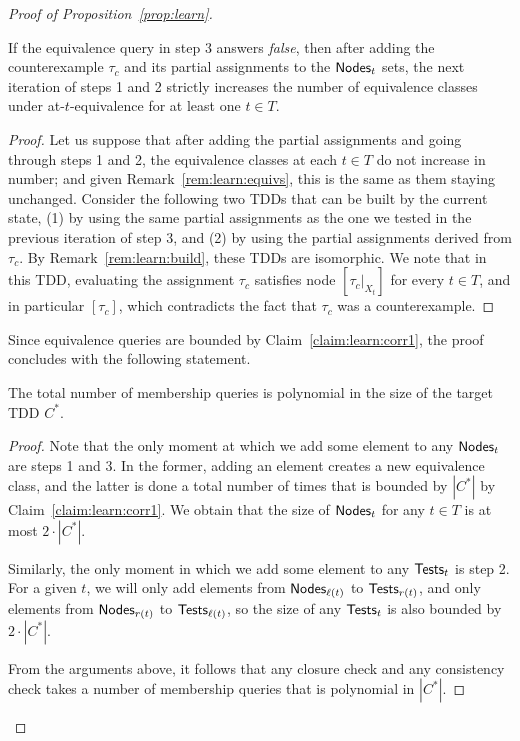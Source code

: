 \begin{toappendix}
\begin{proof}[Proof of Proposition~\ref{prop:learn}]
\begin{claim}\label{claim:learn:corr1}
If the equivalence query in step 3 answers {\em false}, then after adding the counterexample $\tau_c$ and its partial assignments to the ${\sf Nodes}_t$ sets, the next iteration of steps 1 and 2 strictly increases the number of equivalence classes under at-$t$-equivalence for at least one $t\in T$. 
\end{claim}
\begin{proof}
Let us suppose that after adding the partial assignments and going through steps 1 and 2, the equivalence classes at each $t\in T$ do not increase in number; and given Remark~\ref{rem:learn:equivs}, this is the same as them staying unchanged. Consider the following two TDDs that can be built by the current state, (1) by using the same partial assignments as the one we tested in the previous iteration of step 3, and (2) by using the partial assignments derived from $\tau_c$. By Remark~\ref{rem:learn:build}, these TDDs are isomorphic. We note that in this TDD, evaluating the assignment $\tau_c$ satisfies node $[\tau_c\vert_{X_t}]$ for every $t\in T$, and in particular $[\tau_c]$, which contradicts the fact that $\tau_c$ was a counterexample.
\end{proof}
Since equivalence queries are bounded by Claim~\ref{claim:learn:corr1}, the proof concludes with the following statement.
\begin{claim}\label{claim:learn:corr2}
The total number of membership queries is polynomial in the size of the target TDD $C^*$.
\end{claim}
\begin{proof}
Note that the only moment at which we add some element to any ${\sf Nodes}_t$ are steps 1 and 3. In the former, adding an element creates a new equivalence class, and the latter is done a total number of times that is bounded by $|C^*|$ by Claim~\ref{claim:learn:corr1}. We obtain that the size of ${\sf Nodes}_t$ for any $t\in T$ is at most $2\cdot|C^*|$.  

Similarly, the only moment in which we add some element to any ${\sf Tests}_t$ is step 2.
For a given $t$, we will only add elements from ${\sf Nodes}_{\ell(t)}$ to ${\sf Tests}_{r(t)}$, and only elements from ${\sf Nodes}_{r(t)}$ to ${\sf Tests}_{\ell(t)}$, so the size of any ${\sf Tests}_t$ is also bounded by $2\cdot|C^*|$.

From the arguments above, it follows that any closure check and any consistency check takes a number of membership queries that is polynomial in $|C^*|$.


\end{proof}
\end{proof}
\end{toappendix}
